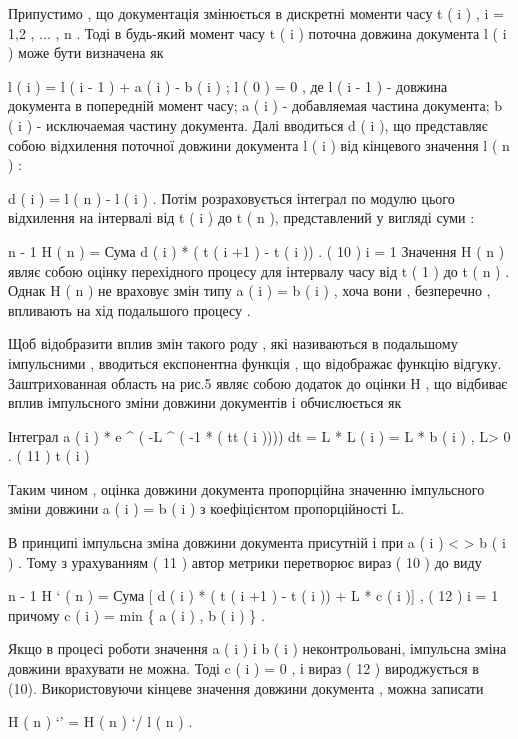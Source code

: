 \documentclass[oneside,final,14pt]{extreport}
\begin{document}
\begin{description}
Припустимо , що документація змінюється в дискретні моменти часу t ( i ) , i = 1,2 , ... , n . Тоді в будь-який момент часу t ( i ) поточна довжина документа l ( i ) може бути визначена як

l ( i ) = l ( i - 1 ) + a ( i ) - b ( i ) ; l ( 0 ) = 0 ,
де l ( i - 1 ) - довжина документа в попередній момент часу; a ( i ) - добавляемая частина документа; b ( i ) - исключаемая частину документа.
Далі вводиться d ( i ), що представляє собою відхилення поточної довжини документа l ( i ) від кінцевого значення l ( n ) :

d ( i ) = l ( n ) - l ( i ) .
Потім розраховується інтеграл по модулю цього відхилення на інтервалі від t ( i ) до t ( n ), представлений у вигляді суми :

n - 1
H ( n ) = Сума \textbar{} d ( i ) \textbar{} * ( t ( i +1 ) - t ( i )) . ( 10 )
i = 1
Значення H ( n ) являє собою оцінку перехідного процесу для інтервалу часу від t ( 1 ) до t ( n ) . Однак H ( n ) не враховує змін типу a ( i ) = b ( i ) , хоча вони , безперечно , впливають на хід подальшого процесу .

Щоб відобразити вплив змін такого роду , які називаються в подальшому імпульсними , вводиться експонентна функція , що відображає функцію відгуку. Заштрихованная область на рис.5 являє собою додаток до оцінки H , що відбиває вплив імпульсного зміни довжини документів і обчислюється як

Інтеграл a ( i ) * e \textasciicircum{} ( -L \textasciicircum{} ( -1 * ( tt ( i )))) dt = L * L ( i ) = L * b ( i ) , L\textgreater{} 0 . ( 11 )
t ( i )

Таким чином , оцінка довжини документа пропорційна значенню імпульсного зміни довжини a ( i ) = b ( i ) з коефіцієнтом пропорційності L.

В принципі імпульсна зміна довжини документа присутній і при a ( i ) \textless{} \textgreater{} b ( i ) . Тому з урахуванням ( 11 ) автор метрики перетворює вираз ( 10 ) до виду

n - 1
H ` ( n ) = Сума {[} \textbar{} d ( i ) \textbar{} * ( t ( i +1 ) - t ( i )) + L * c ( i ){]} , ( 12 )
i = 1
причому c ( i ) = min \{ a ( i ) , b ( i ) \} .

Якщо в процесі роботи значення a ( i ) і b ( i ) неконтрольовані, імпульсна зміна довжини врахувати не можна. Тоді c ( i ) = 0 , і вираз ( 12 ) вироджується в (10). Використовуючи кінцеве значення довжини документа , можна записати

H ( n ) `' = H ( n ) `/ l ( n ) .

\end{description}
\end{document}
